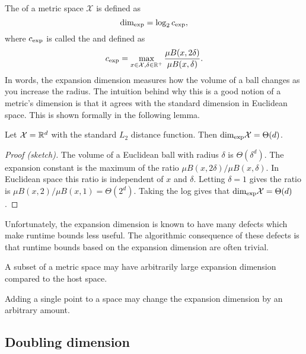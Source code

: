 \documentclass[thesis.tex]{subfiles}
\newcommand{\set}[1]{\mathcal {#1}}
\newcommand{\krdim}{\text{dim}_\textnormal{exp}}
\newcommand{\cexp}{c_\textnormal{exp}}
\begin{document}
The  of a metric space $\set X$ is defined as
\begin{equation}
    \krdim = \log_2 \cexp
    ,
\end{equation}
where $\cexp$ is called the  and defined as
\begin{equation}
    \cexp = \max_{x\in\set X, \delta\in\R^+} \frac{\mu B(x,2\delta)}{\mu B(x,\delta)}
    .
\end{equation}
In words, the expansion dimension measures how the volume of a ball changes as you increase the radius.
The intuition behind why this is a good notion of a metric's dimension is that it agrees with the standard dimension in Euclidean space.
This is shown formally in the following lemma.
\begin{lemma}
    \label{lemma:expansionEuclidean}
    Let $\set X=\R^d$ with the standard $L_2$ distance function.
    Then $\krdim\set X=\Theta(d)$.
\end{lemma}
\begin{proof}[Proof (sketch)]
    The volume of a Euclidean ball with radius $\delta$ is $\Theta(\delta^d)$.
    The expansion constant is the maximum of the ratio $\mu B(x,2\delta) / \mu B (x,\delta)$.
    In Euclidean space this ratio is independent of $x$ and $\delta$.
    Letting $\delta=1$ gives the ratio is $\mu B(x,2) / \mu B(x,1) = \Theta(2^d)$.
    Taking the log gives that $\krdim\set X = \Theta(d)$.
\end{proof}

\noindent
Unfortunately, the expansion dimension is known to have many defects which make runtime bounds less useful.
The algorithmic consequence of these defects is that runtime bounds based on the expansion dimension are often trivial.

\begin{example}
    A subset of a metric space may have arbitrarily large expansion dimension compared to the host space.
\end{example}

\begin{example}
    Adding a single point to a space may change the expansion dimension by an arbitrary amount.
\end{example}


\subsection{Doubling dimension}
\end{document}
